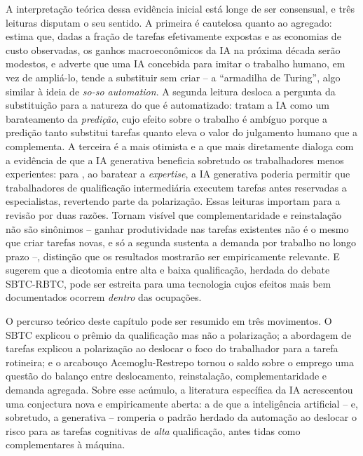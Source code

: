 A interpretação teórica dessa evidência inicial está longe de ser consensual, e três leituras disputam o seu sentido. A primeira é cautelosa quanto ao agregado: \textcite{acemoglu2025simple} estima que, dadas a fração de tarefas efetivamente expostas e as economias de custo observadas, os ganhos macroeconômicos da IA na próxima década serão modestos, e \textcite{brynjolfsson2022turing} adverte que uma IA concebida para imitar o trabalho humano, em vez de ampliá-lo, tende a substituir sem criar -- a ``armadilha de Turing'', algo similar à ideia de \textit{so-so automation}. A segunda leitura desloca a pergunta da substituição para a natureza do que é automatizado: \textcite{agrawalGansGoldfarb2019} tratam a IA como um barateamento da \emph{predição}, cujo efeito sobre o trabalho é ambíguo porque a predição tanto substitui tarefas quanto eleva o valor do julgamento humano que a complementa. A terceira é a mais otimista e a que mais diretamente dialoga com a evidência de que a IA generativa beneficia sobretudo os trabalhadores menos experientes: para \textcite{autor2024rebuild}, ao baratear a \emph{expertise}, a IA generativa poderia permitir que trabalhadores de qualificação intermediária executem tarefas antes reservadas a especialistas, revertendo parte da polarização. Essas leituras importam para a revisão por duas razões. Tornam visível que complementaridade e reinstalação não são sinônimos -- ganhar produtividade nas tarefas existentes não é o mesmo que criar tarefas novas, e só a segunda sustenta a demanda por trabalho no longo prazo --, distinção que os resultados mostrarão ser empiricamente relevante. E sugerem que a dicotomia entre alta e baixa qualificação, herdada do debate SBTC-RBTC, pode ser estreita para uma tecnologia cujos efeitos mais bem documentados ocorrem \emph{dentro} das ocupações.


O percurso teórico deste capítulo pode ser resumido em três movimentos. O SBTC explicou o prêmio da qualificação mas não a polarização; a abordagem de tarefas explicou a polarização ao deslocar o foco do trabalhador para a tarefa rotineira; e o arcabouço Acemoglu-Restrepo tornou o saldo sobre o emprego uma questão do balanço entre deslocamento, reinstalação, complementaridade e demanda agregada. Sobre esse acúmulo, a literatura específica da IA acrescentou uma conjectura nova e empiricamente aberta: a de que a inteligência artificial -- e, sobretudo, a generativa -- romperia o padrão herdado da automação ao deslocar o risco para as tarefas cognitivas de \emph{alta} qualificação, antes tidas como complementares à máquina.

